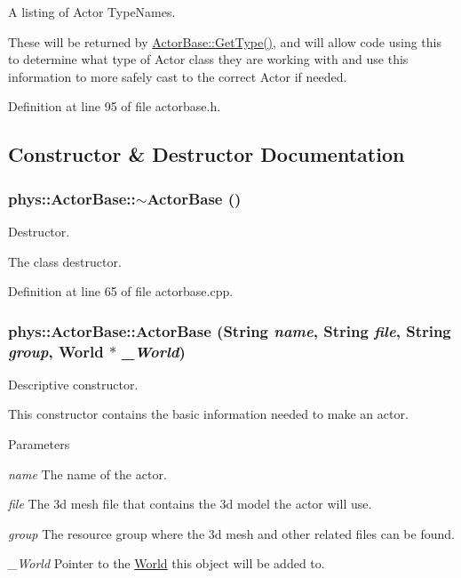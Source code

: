 A listing of Actor TypeNames. 

These will be returned by \hyperlink{classphys_1_1ActorBase_ab8bedea2ef0ce9194731ebeb886333ff}{ActorBase::GetType()}, and will allow code using this to determine what type of Actor class they are working with and use this information to more safely cast to the correct Actor if needed. 

Definition at line 95 of file actorbase.h.



\subsection{Constructor \& Destructor Documentation}
\hypertarget{classphys_1_1ActorBase_a5e5d4b50c83c6851e554b5e7ad65403f}{
\subsubsection[{$\sim$ActorBase}]{\setlength{\rightskip}{0pt plus 5cm}phys::ActorBase::$\sim$ActorBase ()}}
\label{d8/d0f/classphys_1_1ActorBase_a5e5d4b50c83c6851e554b5e7ad65403f}


Destructor. 

The class destructor. 

Definition at line 65 of file actorbase.cpp.

\hypertarget{classphys_1_1ActorBase_ad9d90a68921ce81653e9950c1330809d}{
\subsubsection[{ActorBase}]{\setlength{\rightskip}{0pt plus 5cm}phys::ActorBase::ActorBase ({\bf String} {\em name}, \/  {\bf String} {\em file}, \/  {\bf String} {\em group}, \/  {\bf World} $\ast$ {\em \_\-World})}}
\label{d8/d0f/classphys_1_1ActorBase_ad9d90a68921ce81653e9950c1330809d}


Descriptive constructor. 

This constructor contains the basic information needed to make an actor. 
\begin{DoxyParams}{Parameters}
\item[{\em name}]The name of the actor. \item[{\em file}]The 3d mesh file that contains the 3d model the actor will use. \item[{\em group}]The resource group where the 3d mesh and other related files can be found. \item[{\em \_\-World}]Pointer to the \hyperlink{classphys_1_1World}{World} this object will be added to. \end{DoxyParams}


